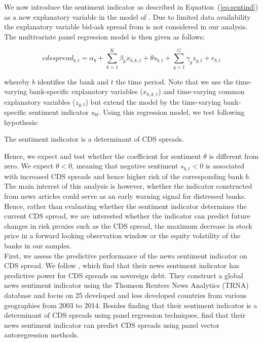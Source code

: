 We now introduce the sentiment indicator as described in \mbox{Equation~(\ref{eq:sentind})} as a new explanatory variable in the model of \cite{annaert2013}. Due to limited data availability the explanatory variable bid-ask spread from \cite{annaert2013} is not considered in our analysis. The multivariate panel regression model is then given as follows:

\begin{equation}
	cdsspread_{b,t} = \alpha_b + \sum_{k=1}^K\beta_{k}x_{b,k,t} + \theta s_{b,t} + \sum_{g=1}^G\gamma_gz_{g,t}+e_{b,t}
\end{equation}

whereby $b$ identifies the bank and $t$ the time period. Note that we use the time-varying bank-specific explanatory variables ($x_{b,k,t}$) and time-varying common explanatory variables ($z_{g,t}$) but extend the model by the time-varying bank-specific sentiment indicator $s_{bt}$. Using this regression model, we test following hypothesis:

\begin{hyp}
	The sentiment indicator is a determinant of CDS spreads.
\end{hyp}

Hence, we expect and test whether the coefficient for sentiment $\theta$ is different from zero. We expect $\theta<0$, meaning that negative sentiment $s_{b,t}<0$ is associated with increased CDS spreads and hence higher risk of the corresponding bank $b$. \\

The main interest of this analysis is however, whether the indicator constructed from news articles could serve as an early warning signal for distressed banks. Hence, rather than evaluating whether the sentiment indicator determines the current CDS spread, we are interested whether the indicator can predict future changes in risk proxies such as the CDS spread, the maximum decrease in stock price in a forward looking observation window or the equity volatility of the banks in our samples. \\

First, we assess the predictive performance of the news sentiment indicator on CDS spread. We follow \cite{cathcart2020}, which find that their news sentiment indicator has predictive power for CDS spreads on sovereign debt. They construct a global news sentiment indicator using the Thomson Reuters News Analytics (TRNA) database and focus on 25 developed and less developed countries from various geographies from 2003 to 2014. Besides finding that their sentiment indicator is a determinant of CDS spreads using panel regression techniques, \cite{cathcart2020} find that their news sentiment indicator can predict CDS spreads using panel vector autoregression methods. \\

